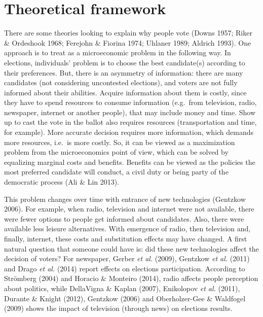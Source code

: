 \documentclass[
  12pt,
]{article}
\begin{document}
\hypertarget{theoretical-framework}{%
\section{Theoretical framework}\label{theoretical-framework}}

There are some theories looking to explain why people vote (Downs 1957;
Riker \& Ordeshook 1968; Ferejohn \& Fiorina 1974; Uhlaner 1989; Aldrich
1993). One approach is to treat as a microeconomic problem in the
following way. In elections, individuals' problem is to choose the best
candidate(s) according to their preferences. But, there is an asymmetry
of information: there are many candidates (not considering uncontested
elections), and voters are not fully informed about their abilities.
Acquire information about them is costly, since they have to spend
resources to consume information (e.g.~from television, radio,
newspaper, internet or another people), that may include money and time.
Show up to cast the vote in the ballot also requires resources
(transportation and time, for example). More accurate decision requires
more information, which demands more resources, i.e.~is more costly. So,
it can be viewed as a maximization problem from the microeconomics point
of view, which can be solved by equalizing marginal costs and benefits.
Benefits can be viewed as the policies the most preferred candidate will
conduct, a civil duty or being party of the democratic process (Ali \&
Lin 2013).

This problem changes over time with entrance of new technologies
(Gentzkow 2006). For example, when radio, television and internet were
not available, there were fewer options to people get informed about
candidates. Also, there were available less leisure alternatives. With
emergence of radio, then television and, finally, internet, these costs
and substitution effects may have changed. A first natural question that
someone could have is: did these new technologies affect the decision of
voters? For newspaper, Gerber \emph{et al.} (2009), Gentzkow \emph{et
al.} (2011) and Drago \emph{et al.} (2014) report effects on elections
participation. According to Strömberg (2004) and Horacio \& Monteiro
(2014), radio affects people perception about politics, while DellaVigna
\& Kaplan (2007), Enikolopov \emph{et al.} (2011), Durante \& Knight
(2012), Gentzkow (2006) and Oberholzer-Gee \& Waldfogel (2009) shows the
impact of television (through news) on elections results.
\end{document}
